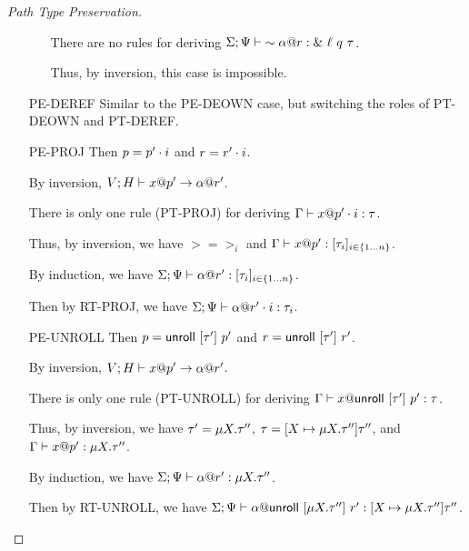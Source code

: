\begin{proof}[Path Type Preservation]
\begin{itemize}
\begin{itemize}
	  There are no rules for deriving
	  ${\Sigma;\Psi} \vdash {\sim{{\alpha}@{r}}} : {\&~{{\ell}~{q}~{\tau}}}$.

	  Thus, by inversion, this case is impossible.
      \end{itemize}
    \item[PE-DEREF] 
      Similar to the \textsc{PE-DEOWN} case, but switching the roles of
      \textsc{PT-DEOWN} and \textsc{PT-DEREF}.
    \item[PE-PROJ] Then $p = {p'}\cdot{i}$ and $r = {r'}\cdot{i}$.

      By inversion, ${V;H} \vdash {{x}@{p'}} \to {{\alpha}@{r'}}$.

      There is only one rule (\textsc{PT-PROJ}) for deriving ${\Gamma} \vdash {{x}@{{p'}\cdot{i}}} : {\tau}$.

      Thus, by inversion, we have $\gt = \gt_i$ and ${\Gamma} \vdash {{x}@{p'}} : {[{{\tau}_{i}}]_{{i} \in \{1 \ldots {n}\} }}$.

      By induction, we have ${\Sigma;\Psi} \vdash {{\alpha}@{r'}} : {[{{\tau}_{i}}]_{{i} \in \{1 \ldots {n}\} }}$.

      Then by \textsc{RT-PROJ}, we have ${\Sigma;\Psi} \vdash {{\alpha}@{{r'}\cdot{i}}} : {\tau_i}$.
    \item[PE-UNROLL] Then $p = \mathsf{unroll}~[{\tau'}]~{p'}$ and $r = \mathsf{unroll}~[{\tau'}]~{r'}$.

      By inversion, ${V;H} \vdash {{x}@{p'}} \to {{\alpha}@{r'}}$.

      There is only one rule (\textsc{PT-UNROLL}) for deriving
      ${\Gamma} \vdash {{x}@{\mathsf{unroll}~[{\tau'}]~{p'}}} : {\tau}$.

      Thus, by inversion, we have $\tau' = \mu {X}.{\tau''}$,
      $\tau = [{X} \mapsto {\mu {X}.{\tau''}}] {\tau''}$, and
      ${\Gamma} \vdash {{x}@{p'}} : {\mu {X}.{\tau''}}$.

      By induction, we have ${\Sigma;\Psi} \vdash {{\alpha}@{r'}} : {\mu {X}.{\tau''}}$.

      Then by \textsc{RT-UNROLL}, we have
      ${\Sigma;\Psi} \vdash {{\alpha}@{\mathsf{unroll}~[{\mu {X}.{\tau''}}]~{r'}}} : {[{X} \mapsto {\mu {X}.{\tau''}}] {\tau''}}$.
  \end{itemize}
\end{proof}
